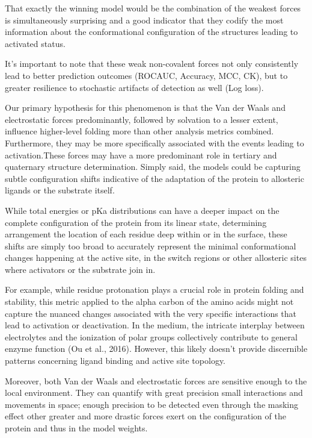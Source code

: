 \documentclass{article}
\begin{document}
That exactly the winning model would be the combination of the weakest forces is simultaneously surprising and a good indicator that they codify the most information about the conformational configuration of the structures leading to activated status.

It's important to note that these weak non-covalent forces not only consistently lead to better prediction outcomes (ROCAUC, Accuracy, MCC, CK), but to greater resilience to stochastic artifacts of detection as well (Log loss).

Our primary hypothesis for this phenomenon is that the Van der Waals and electrostatic forces predominantly, followed by solvation to a lesser extent, influence higher-level folding more than other analysis metrics combined. Furthermore, they may be more specifically associated with the events leading to activation.These forces may have a more predominant role in tertiary and quaternary structure determination. Simply said, the models could be capturing subtle configuration shifts indicative of the adaptation of the protein to allosteric ligands or the substrate itself.

While total energies or pKa distributions can have a deeper impact on the complete configuration of the protein from its linear state, determining arrangement the location of each residue deep within or in the surface, these shifts are simply too broad to accurately represent the minimal conformational changes happening at the active site, in the switch regions or other allosteric sites where activators or the substrate join in.

For example, while residue protonation plays a crucial role in protein folding and stability, this metric applied to the alpha carbon of the amino acids might not capture the nuanced changes associated with the very specific interactions that lead to activation or deactivation. In the medium, the intricate interplay between electrolytes and the ionization of polar groups collectively contribute to general enzyme function (Ou et al., 2016). However, this likely doesn't provide discernible patterns concerning ligand binding and active site topology.

Moreover, both Van der Waals and electrostatic forces are sensitive enough to the local environment. They can quantify with great precision small interactions and movements in space; enough precision to be detected even through the masking effect other greater and more drastic forces exert on the configuration of the protein and thus in the model weights.
\end{document}
